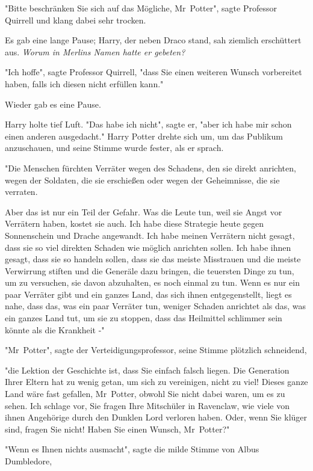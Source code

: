 {"Bitte beschränken Sie sich auf das Mögliche, Mr~Potter", sagte Professor Quirrell und klang dabei sehr trocken.

Es gab eine lange Pause; Harry, der neben Draco stand, sah ziemlich erschüttert aus. \emph{Worum in Merlins Namen hatte er gebeten?}

"Ich hoffe", sagte Professor Quirrell, "dass Sie einen weiteren Wunsch vorbereitet haben, falls ich diesen nicht erfüllen kann."

Wieder gab es eine Pause.

Harry holte tief Luft. "Das habe ich nicht", sagte er, "aber ich habe mir schon einen anderen ausgedacht." Harry Potter drehte sich um, um das Publikum anzuschauen, und seine Stimme wurde fester, als er sprach.

"Die Menschen fürchten Verräter wegen des Schadens, den sie direkt anrichten, wegen der Soldaten, die sie erschießen oder wegen der Geheimnisse, die sie verraten.

Aber das ist nur ein Teil der Gefahr. Was die Leute tun, weil sie Angst vor Verrätern haben, kostet sie auch. Ich habe diese Strategie heute gegen Sonnenschein und Drache angewandt. Ich habe meinen Verrätern nicht gesagt, dass sie so viel direkten Schaden wie möglich anrichten sollen. Ich habe ihnen gesagt, dass sie so handeln sollen, dass sie das meiste Misstrauen und die meiste Verwirrung stiften und die Generäle dazu bringen, die teuersten Dinge zu tun, um zu versuchen, sie davon abzuhalten, es noch einmal zu tun. Wenn es nur ein paar Verräter gibt und ein ganzes Land, das sich ihnen entgegenstellt, liegt es nahe, dass das, was ein paar Verräter tun, weniger Schaden anrichtet als das, was ein ganzes Land tut, um sie zu stoppen, dass das Heilmittel schlimmer sein könnte als die Krankheit -"

"Mr~Potter", sagte der Verteidigungsprofessor, seine Stimme plötzlich schneidend,

"die Lektion der Geschichte ist, dass Sie einfach falsch liegen. Die Generation Ihrer Eltern hat zu wenig getan, um sich zu vereinigen, nicht zu viel! Dieses ganze Land wäre fast gefallen, Mr~Potter, obwohl Sie nicht dabei waren, um es zu sehen. Ich schlage vor, Sie fragen Ihre Mitschüler in Ravenclaw, wie viele von ihnen Angehörige durch den Dunklen Lord verloren haben. Oder, wenn Sie klüger sind, fragen Sie nicht! Haben Sie einen Wunsch, Mr~Potter?"

"Wenn es Ihnen nichts ausmacht", sagte die milde Stimme von Albus Dumbledore,

}

